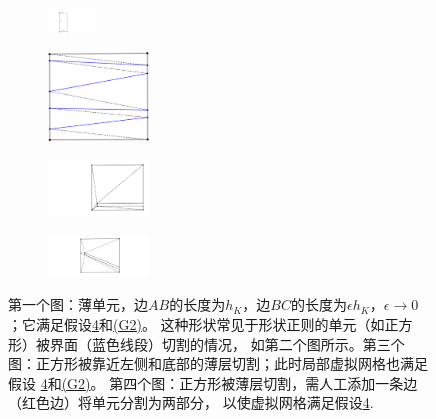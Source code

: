 \begin{figure}[htp]
\centering
\begin{subfigure}{.2\textwidth}
\includegraphics[width=0.5in]{./figures/maxwell/submesh5}
\label{fig:submesh5}
\end{subfigure}
\begin{subfigure}{.2\textwidth}
\includegraphics[width=1.05in]{./figures/maxwell/submesh8}
\label{fig:submesh8}
\end{subfigure}
\begin{subfigure}{.2\textwidth}
\includegraphics[width=1.05in]{./figures/maxwell/submesh6}
\label{fig:submesh4}
\end{subfigure}
\begin{subfigure}{.2\textwidth}
\includegraphics[width=1.05in]{./figures/maxwell/submesh7}
\label{fig:submesh3}
\end{subfigure}
\caption{第一个图：薄单元，边$AB$的长度为$h_K$，边$BC$的长度为$\epsilon
h_K$，$\epsilon\rightarrow
0$；它满足假设\hyperref[assump_vmesh]{4}和\hyperref[asp:polygonG2]{(G2)}。
这种形状常见于形状正则的单元（如正方形）被界面（蓝色线段）切割的情况，
如第二个图所示。第三个图：正方形被靠近左侧和底部的薄层切割；此时局部虚拟网格也满足假设
\hyperref[assump_vmesh]{4}和\hyperref[asp:polygonG2]{(G2)}。
第四个图：正方形被薄层切割，需人工添加一条边（红色边）将单元分割为两部分，
以使虚拟网格满足假设\hyperref[assump_vmesh]{4}.}
\label{fig:submesh}
\end{figure}

